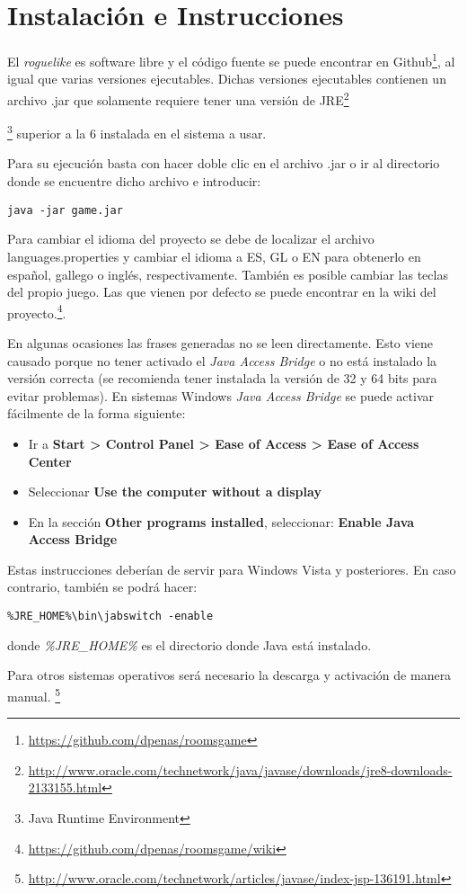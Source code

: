 \chapter{Instalación e Instrucciones}

El \textit{roguelike} es software libre y el código fuente se puede encontrar en Github\footnote{\url{https://github.com/dpenas/roomsgame}}, al igual que varias versiones ejecutables. Dichas versiones ejecutables contienen un archivo .jar que solamente requiere tener una versión de JRE\footnote{\url{http://www.oracle.com/technetwork/java/javase/downloads/jre8-downloads-2133155.html}}{\footnote{Java Runtime Environment} superior a la 6 instalada en el sistema a usar. 

Para su ejecución basta con hacer doble clic en el archivo .jar o ir al directorio donde se encuentre dicho archivo e introducir:

\begin{lstlisting}[label=lst:bash,caption=Comando para la ejecución del videojuego]
java -jar game.jar
\end{lstlisting}

Para cambiar el idioma del proyecto se debe de localizar el archivo languages.properties y cambiar el idioma a ES, GL o EN para obtenerlo en español, gallego o inglés, respectivamente. También es posible cambiar las teclas del propio juego. Las que vienen por defecto se puede encontrar en la wiki del proyecto.\footnote{\url{https://github.com/dpenas/roomsgame/wiki}}.

En algunas ocasiones las frases generadas no se leen directamente. Esto viene causado porque no tener activado el \textit{Java Access Bridge} o no está instalado la versión correcta (se recomienda tener instalada la versión de 32 y 64 bits para evitar problemas). 
En sistemas Windows \textit{Java Access Bridge} se puede activar fácilmente de la forma siguiente:

\begin{itemize}
\item Ir a \textbf{Start > Control Panel > Ease of Access > Ease of Access Center}
\item Seleccionar \textbf{Use the computer without a display}
\item En la sección \textbf{Other programs installed}, seleccionar: \textbf{Enable Java Access Bridge}
\end{itemize}

Estas instrucciones deberían de servir para Windows Vista y posteriores. En caso contrario, también se podrá hacer:

\begin{verbatim}
%JRE_HOME%\bin\jabswitch -enable
\end{verbatim}

donde \textit{\%JRE\_HOME\%} es el directorio donde Java está instalado.

Para otros sistemas operativos será necesario la descarga y activación de manera manual.  \footnote{\url{http://www.oracle.com/technetwork/articles/javase/index-jsp-136191.html}}}